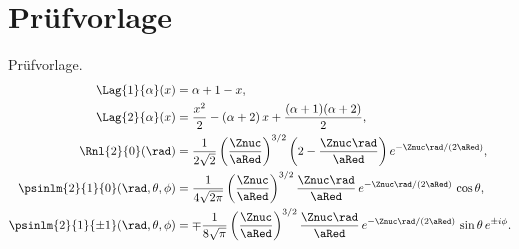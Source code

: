 \chapter{Prüfvorlage}\label{c11}

Prüfvorlage.
\begin{align}
  \Lag{1}{\alpha}(x) &= \alpha + 1 - x,
    \label{c11.eq.lag1} \\
  \Lag{2}{\alpha}(x) &= \frac{x^2}{2} - (\alpha + 2)\,x + \frac{(\alpha + 1)(\alpha + 2)}{2},
    \label{c11.eq.lag2} \\
  \Rnl{2}{0}(\rad) &= \frac{1}{2\sqrt{2}}\left(\frac{\Znuc}{\aRed}\right)^{3/2}\left(2 - \frac{\Znuc\rad}{\aRed}\right) e^{-\Znuc\rad/(2\aRed)},
    \label{c11.eq.r20} \\
  \psinlm{2}{1}{0}(\rad, \theta, \phi) &= \frac{1}{4\sqrt{2\pi}}\left(\frac{\Znuc}{\aRed}\right)^{3/2}\frac{\Znuc\rad}{\aRed}\,e^{-\Znuc\rad/(2\aRed)}\,\cos\theta,
    \label{c11.eq.psi210} \\
  \psinlm{2}{1}{\pm 1}(\rad, \theta, \phi) &= \mp\frac{1}{8\sqrt{\pi}}\left(\frac{\Znuc}{\aRed}\right)^{3/2}\frac{\Znuc\rad}{\aRed}\,e^{-\Znuc\rad/(2\aRed)}\,\sin\theta\,e^{\pm i\phi}.
    \label{c11.eq.psi21pm}
\end{align}
